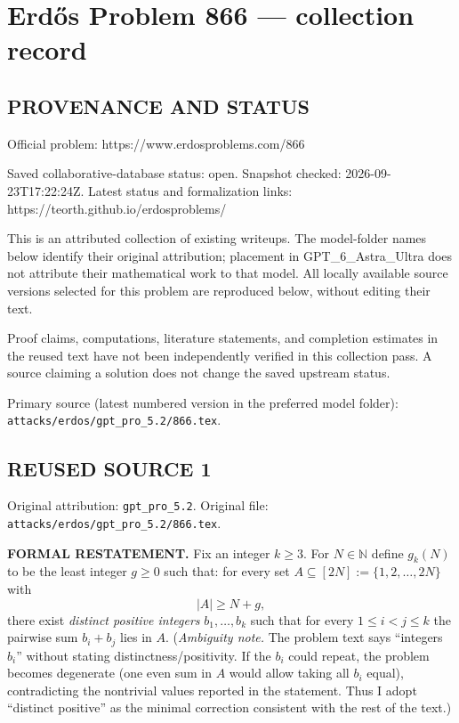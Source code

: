 \section*{Erd\H{o}s Problem 866 --- collection record}

\subsection*{PROVENANCE AND STATUS}
Official problem: https://www.erdosproblems.com/866

Saved collaborative-database status: open.
Snapshot checked: 2026-09-23T17:22:24Z.
Latest status and formalization links: https://teorth.github.io/erdosproblems/

This is an attributed collection of existing writeups. The model-folder names below identify their original attribution; placement in GPT\_6\_Astra\_Ultra does not attribute their mathematical work to that model. All locally available source versions selected for this problem are reproduced below, without editing their text.

Proof claims, computations, literature statements, and completion estimates in the reused text have not been independently verified in this collection pass. A source claiming a solution does not change the saved upstream status.

Primary source (latest numbered version in the preferred model folder): \texttt{attacks/erdos/gpt\_pro\_5.2/866.tex}.

\subsection*{REUSED SOURCE 1}
Original attribution: \texttt{gpt\_pro\_5.2}.
Original file: \texttt{attacks/erdos/gpt\_pro\_5.2/866.tex}.


\bigskip
\noindent\textbf{FORMAL RESTATEMENT.}
Fix an integer $k\ge 3$. For $N\in\mathbb{N}$ define $g_k(N)$ to be the least integer $g\ge 0$ such that:
for every set $A\subseteq [2N]:=\{1,2,\dots,2N\}$ with
\[
|A|\ge N+g,
\]
there exist \emph{distinct positive integers} $b_1,\dots,b_k$ such that for every $1\le i<j\le k$ the pairwise sum $b_i+b_j$ lies in $A$.
(\emph{Ambiguity note.} The problem text says ``integers $b_i$'' without stating distinctness/positivity. If the $b_i$ could repeat, the problem becomes degenerate (one even sum in $A$ would allow taking all $b_i$ equal), contradicting the nontrivial values reported in the statement. Thus I adopt ``distinct positive'' as the minimal correction consistent with the rest of the text.)


